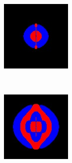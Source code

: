 \begin{figure}[p]
    \centering
    \begin{subfigure}[b]{0.3\textwidth}
        \includegraphics[width=\textwidth]{include/graphics/pml-on-0}
    \end{subfigure}
    ~
    \begin{subfigure}[b]{0.3\textwidth}
        \includegraphics[width=\textwidth]{include/graphics/pml-on-1}

\end{subfigure}
\end{figure}
